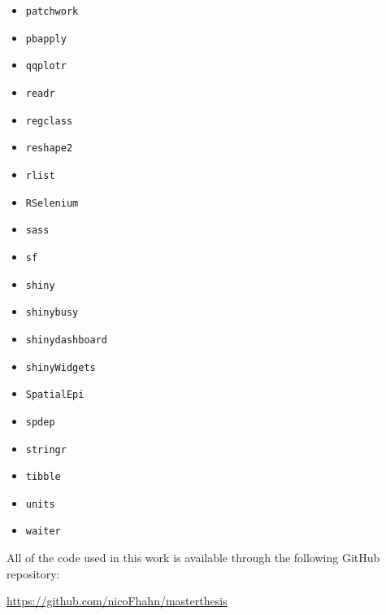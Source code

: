 \begin{itemize}
    \item \texttt{patchwork} \autocite[][]{patchwork}
    \item \texttt{pbapply} \autocite[][]{pbapply}
    \item \texttt{qqplotr} \autocite[][]{qqplotr}
    \item \texttt{readr} \autocite[][]{readr}
    \item \texttt{regclass} \autocite[][]{regclass}
    \item \texttt{reshape2} \autocite[][]{reshape2}
    \item \texttt{rlist} \autocite[][]{rlist}
    \item \texttt{RSelenium} \autocite[][]{RSelenium}
    \item \texttt{sass} \autocite[][]{sass}
    \item \texttt{sf} \autocite[][]{sf}
    \item \texttt{shiny} \autocite[][]{shiny}
    \item \texttt{shinybusy} \autocite[][]{shinybusy}
    \item \texttt{shinydashboard} \autocite[][]{shinydashboard}
    \item \texttt{shinyWidgets} \autocite[][]{shinyWidgets}
    \item \texttt{SpatialEpi} \autocite[][]{SpatialEpi}
    \item \texttt{spdep} \autocite[][]{spdep}
    \item \texttt{stringr} \autocite[][]{stringr}
    \item \texttt{tibble} \autocite[][]{tibble}
    \item \texttt{units} \autocite[][]{units}
    \item \texttt{waiter} \autocite[][]{waiter}
\end{itemize}
All of the code used in this work is available through the following GitHub repository:
\begin{center}
    \href{https://github.com/nicoFhahn/masterthesis}{https://github.com/nicoFhahn/masterthesis}
\end{center}